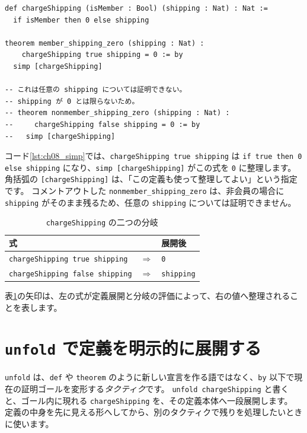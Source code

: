 \begin{listing}[htbp]
\begin{verbatim}
def chargeShipping (isMember : Bool) (shipping : Nat) : Nat :=
  if isMember then 0 else shipping

theorem member_shipping_zero (shipping : Nat) :
    chargeShipping true shipping = 0 := by
  simp [chargeShipping]

-- これは任意の shipping については証明できない。
-- shipping が 0 とは限らないため。
-- theorem nonmember_shipping_zero (shipping : Nat) :
--     chargeShipping false shipping = 0 := by
--   simp [chargeShipping]
\end{verbatim}
\caption{\texttt{member\_shipping\_zero}}
\label{lst:ch08_simp}
\end{listing}

コード\ref{lst:ch08_simp}では、\texttt{chargeShipping true shipping} は \texttt{if true then 0 else shipping} になり、\texttt{simp [chargeShipping]} がこの式を \texttt{0} に整理します。
角括弧の \texttt{[chargeShipping]} は、「この定義も使って整理してよい」という指定です。
コメントアウトした \texttt{nonmember\_shipping\_zero} は、非会員の場合に \texttt{shipping} がそのまま残るため、任意の \texttt{shipping} については証明できません。

\begin{table}[htbp]
\centering
\caption{\texttt{chargeShipping} の二つの分岐}
\label{tab:ch08-simp-branches}
\begin{tabular}{@{}lcl@{}}
\toprule
式 & & 展開後 \\
\midrule
\texttt{chargeShipping true shipping} & $\Longrightarrow$ & \texttt{0} \\
\texttt{chargeShipping false shipping} & $\Longrightarrow$ & \texttt{shipping} \\
\bottomrule
\end{tabular}
\end{table}

表\ref{tab:ch08-simp-branches}の矢印は、左の式が定義展開と分岐の評価によって、右の値へ整理されることを表します。

\section{\texttt{unfold} で定義を明示的に展開する}

\texttt{unfold} は、\texttt{def} や \texttt{theorem} のように新しい宣言を作る語ではなく、\texttt{by} 以下で現在の証明ゴールを変形する\emph{タクティク}です。
\texttt{unfold chargeShipping} と書くと、ゴール内に現れる \texttt{chargeShipping} を、その定義本体へ一段展開します。
定義の中身を先に見える形へしてから、別のタクティクで残りを処理したいときに使います。

